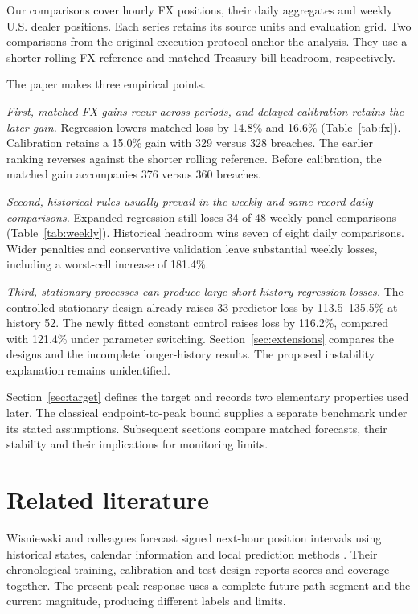 \documentclass[11pt,a4paper]{article}
\begin{document}
Our comparisons cover hourly FX positions, their daily aggregates and weekly U.S. dealer positions. Each series retains its source units and evaluation grid. Two comparisons from the original execution protocol anchor the analysis. They use a shorter rolling FX reference and matched Treasury-bill headroom, respectively.

The paper makes three empirical points.

\textit{First, matched FX gains recur across periods, and delayed calibration retains the later gain.} Regression lowers matched loss by 14.8\% and 16.6\% (Table~\ref{tab:fx}). Calibration retains a 15.0\% gain with 329 versus 328 breaches. The earlier ranking reverses against the shorter rolling reference. Before calibration, the matched gain accompanies 376 versus 360 breaches.

\textit{Second, historical rules usually prevail in the weekly and same-record daily comparisons.} Expanded regression still loses 34 of 48 weekly panel comparisons (Table~\ref{tab:weekly}). Historical headroom wins seven of eight daily comparisons. Wider penalties and conservative validation leave substantial weekly losses, including a worst-cell increase of 181.4\%.

\textit{Third, stationary processes can produce large short-history regression losses.} The controlled stationary design already raises 33-predictor loss by 113.5--135.5\% at history 52. The newly fitted constant control raises loss by 116.2\%, compared with 121.4\% under parameter switching. Section~\ref{sec:extensions} compares the designs and the incomplete longer-history results. The proposed instability explanation remains unidentified.

Section~\ref{sec:target} defines the target and records two elementary properties used later. The classical endpoint-to-peak bound supplies a separate benchmark under its stated assumptions. Subsequent sections compare matched forecasts, their stability and their implications for monitoring limits.

\FloatBarrier

\section{Related literature}\label{sec:literature}

Wisniewski and colleagues forecast signed next-hour position intervals using historical states, calendar information and local prediction methods \citep{wisniewski2020,wisniewski2024}. Their chronological training, calibration and test design reports scores and coverage together. The present peak response uses a complete future path segment and the current magnitude, producing different labels and limits.
\end{document}
